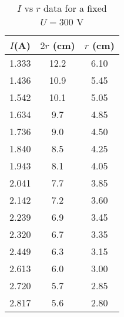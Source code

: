 \begin{table}[H]
\centering
\begin{tabular}{|c|c|c|} \hline
    $I$(A)& $2r$ (cm) & $r$ (cm)  \\ \hline
    1.333 & 12.2 & 6.10  \\
    1.436 & 10.9 & 5.45 \\
    1.542 & 10.1 & 5.05 \\
    1.634 &  9.7 & 4.85 \\
    1.736 &  9.0   & 4.50  \\
    1.840  &  8.5 & 4.25 \\
    1.943 &  8.1 & 4.05 \\
    2.041 &  7.7 & 3.85 \\
    2.142 &  7.2 & 3.60 \\
    2.239 &  6.9 & 3.45 \\
    2.320  &  6.7 & 3.35 \\
    2.449 &  6.3 & 3.15 \\
    2.613 &  6.0   & 3.00    \\
    2.720  &  5.7 & 2.85 \\
    2.817 &  5.6 & 2.80 \\
    \hline
    \end{tabular}    
    \caption{$I$ vs $r$ data for a fixed $U=300$ V}
    \label{tab:1}
\end{table}
